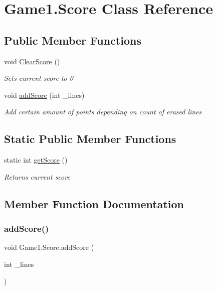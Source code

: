\hypertarget{class_game1_1_1_score}{}\section{Game1.\+Score Class Reference}
\label{class_game1_1_1_score}
\subsection*{Public Member Functions}
\begin{DoxyCompactItemize}
\item 
void \mbox{\hyperlink{class_game1_1_1_score_a4d4e002635cc2683c7ce000ce47f68e4}{Clear\+Score}} ()
\begin{DoxyCompactList}\small\item\em Sets current score to 0 \end{DoxyCompactList}\item 
void \mbox{\hyperlink{class_game1_1_1_score_a9f4ca9401c0b7884535ef067b8c73dea}{add\+Score}} (int \+\_\+lines)
\begin{DoxyCompactList}\small\item\em Add certain amount of points depending on count of erased lines \end{DoxyCompactList}\end{DoxyCompactItemize}
\subsection*{Static Public Member Functions}
\begin{DoxyCompactItemize}
\item 
static int \mbox{\hyperlink{class_game1_1_1_score_a7797ed7e99fe9bbc22cebcd6b67d7db6}{get\+Score}} ()
\begin{DoxyCompactList}\small\item\em Returns current score \end{DoxyCompactList}\end{DoxyCompactItemize}


\subsection{Member Function Documentation}
\mbox{\label{class_game1_1_1_score_a9f4ca9401c0b7884535ef067b8c73dea}} 
\subsubsection{\texorpdfstring{addScore()}{addScore()}}
{\footnotesize\ttfamily void Game1.\+Score.\+add\+Score (\begin{DoxyParamCaption}\item[{int}]{\+\_\+lines }\end{DoxyParamCaption})}



